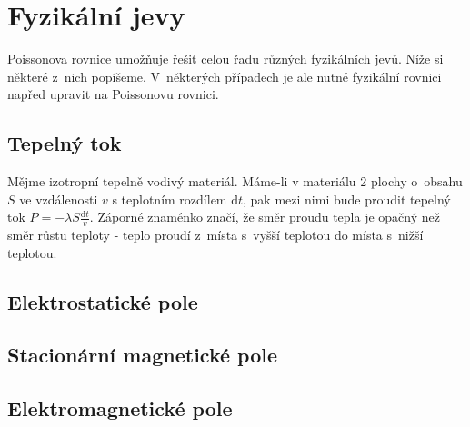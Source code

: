 \chapter{Fyzikální jevy}

Poissonova rovnice umožňuje řešit celou řadu různých fyzikálních jevů. Níže si některé z~nich popíšeme. V~některých případech
je ale nutné fyzikální rovnici napřed upravit na Poissonovu rovnici.

\section{Tepelný tok}

Mějme izotropní tepelně vodivý materiál. 
Máme-li v materiálu 2 plochy o~obsahu \(S\) ve vzdálenosti \(v\) s teplotním rozdílem \(\mathrm{d}t\), pak mezi nimi bude proudit
tepelný tok \(P = -\lambda S \frac{\mathrm{d}t}{v}\). Záporné znaménko značí, že směr proudu tepla je opačný než směr růstu
teploty - teplo proudí z~místa s~vyšší teplotou do místa s~nižší teplotou.


\section{Elektrostatické pole}

\section{Stacionární magnetické pole}

\section{Elektromagnetické pole}
